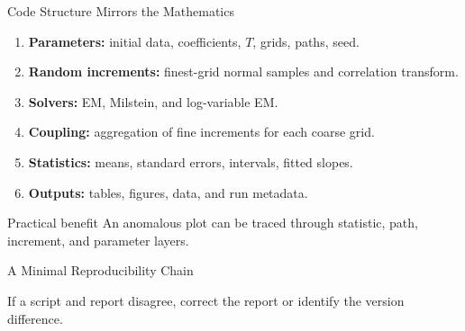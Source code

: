 \documentclass[aspectratio=169,10pt]{beamer}
\begin{document}
\begin{frame}{Code Structure Mirrors the Mathematics}
  \begin{enumerate}
    \item \textbf{Parameters:} initial data, coefficients, $T$, grids, paths, seed.
    \item \textbf{Random increments:} finest-grid normal samples and correlation transform.
    \item \textbf{Solvers:} EM, Milstein, and log-variable EM.
    \item \textbf{Coupling:} aggregation of fine increments for each coarse grid.
    \item \textbf{Statistics:} means, standard errors, intervals, fitted slopes.
    \item \textbf{Outputs:} tables, figures, data, and run metadata.
  \end{enumerate}
  \begin{block}{Practical benefit}
    An anomalous plot can be traced through statistic, path, increment, and parameter layers.
  \end{block}
\end{frame}

\begin{frame}{A Minimal Reproducibility Chain}
  \centering
  \vspace{0.6em}

  If a script and report disagree, correct the report or identify the version difference.
\end{frame}
\end{document}
